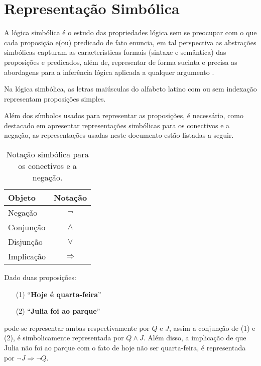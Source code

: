\section{Representação Simbólica}\label{sec:LogicsSimbolic}

A lógica simbólica é o estudo das propriedades lógica sem se preocupar com o que cada proposição e(ou) predicado de fato enuncia, em tal perspectiva as abstrações simbólicas capturam as características formais (sintaxe e semântica) das proposições e predicados, além de, representar de forma sucinta e precisa as abordagens para a inferência lógica aplicada a qualquer argumento \cite{russel1910principia, hamilton1988logic}.

\begin{definicao}\label{def:SimbolosProposicionais}
	Na lógica simbólica, as letras maiúsculas do alfabeto latino com ou sem indexação representam proposições simples.
\end{definicao}

Além dos símbolos usados para representar as proposições, é necessário, como destacado em \cite{leonidas2002} apresentar representações simbólicas para os conectivos e a negação, as representações usadas neste documento estão listadas a seguir.

\begin{table}[h]
	\centering
	\begin{tabular}{lc}
		\hline
		\textbf{Objeto} & \textbf{Notação}\\
		\hline
		Negação & $\neg$\\
		Conjunção & $\land$\\
		Disjunção & $\lor$\\
		Implicação & $\Rightarrow$\\
		\hline
	\end{tabular}
	\caption{Notação simbólica para os conectivos e a negação.}
\end{table}

\begin{exemplo}\label{exe:RepresentacaoSimbolica1}
	Dado duas proposições:
	\begin{itemize}
		\item[(1)] ``\textbf{Hoje é quarta-feira}''
		\item[(2)] ``\textbf{Julia foi ao parque}''
	\end{itemize}
	pode-se representar ambas respectivamente por $Q$ e $J$, assim a conjunção de (1) e (2), é simbolicamente representada por $Q \land J$. Além disso, a implicação de que Julia não foi ao parque com o fato de hoje não ser quarta-feira, é representada por $\neg J \Rightarrow \neg Q$.
\end{exemplo}

